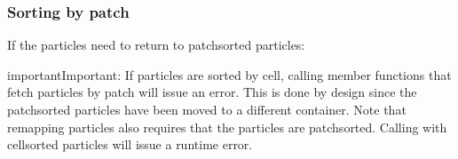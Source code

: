 \documentclass[letterpaper,10pt,english]{sphinxmanual}
\begin{document}
\begin{sphinxVerbatim}[commandchars=\\\{\},formatcom=\scriptsize]
          
             

             

             
               
\end{sphinxVerbatim}


\subsubsection{Sorting by patch}
\label{\detokenize{Source/Particles:sorting-by-patch}}
If the particles need to return to patch\sphinxhyphen{}sorted particles:

\begin{sphinxVerbatim}[commandchars=\\\{\},formatcom=\scriptsize]
 

\end{sphinxVerbatim}

\begin{sphinxadmonition}{important}{Important:}
If particles are sorted by cell, calling  member functions that fetch particles by patch will issue an error.
This is done by design since the patch\sphinxhyphen{}sorted particles have been moved to a different container.
Note that remapping particles also requires that the particles are patch\sphinxhyphen{}sorted.
Calling  with cell\sphinxhyphen{}sorted particles will issue a run\sphinxhyphen{}time error.
\end{sphinxadmonition}
\end{document}
